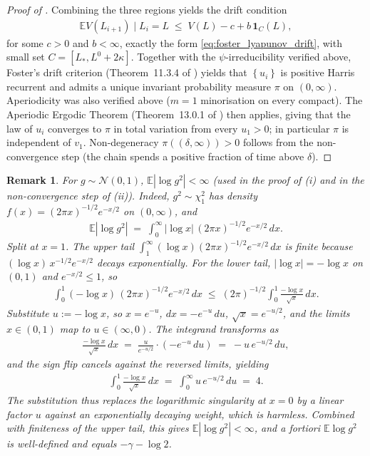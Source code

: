 \documentclass{article}
\newcommand{\Set}[1]{\left\{ #1 \right\}}
\newcommand{\Exp}[1]{\mathbb{E} #1}
\newcommand{\cond}{\mid}
\newtheorem{remark}[theorem]{Remark}
\newcommand{\mcN}{\mathcal{N}}
\begin{document}
\begin{proof}[Proof of ]
  Combining the three regions yields the drift condition
  \begin{eqnarray*}
    \Exp{V(L_{i+1}) \cond L_i = L} \;\le\; V(L) - c + b\,\mathbf{1}_C(L),
  \end{eqnarray*}
  for some $c > 0$ and $b < \infty$, exactly the form \eqref{eq:foster_lyapunov_drift}, with small set $C = [L_*, L^0 + 2\kappa]$. Together with the $\psi$-irreducibility verified above, Foster's drift criterion (Theorem~11.3.4 of \cite{meyn1993markov}) yields that $\Set{u_i}$ is positive Harris recurrent and admits a unique invariant probability measure $\pi$ on $(0, \infty)$. Aperiodicity was also verified above ($m = 1$ minorisation on every compact). The Aperiodic Ergodic Theorem (Theorem~13.0.1 of \cite{meyn1993markov}) then applies, giving that the law of $u_i$ converges to $\pi$ in total variation from every $u_1 > 0$; in particular $\pi$ is independent of $v_1$. Non-degeneracy $\pi((\delta,\infty)) > 0$ follows from the non-convergence step (the chain spends a positive fraction of time above $\delta$).
\end{proof}

\begin{remark}
  \label{rem:log_g_sq_integrable}
  For $g \sim \mcN(0, 1)$, $\Exp{|\log g^2|} < \infty$ (used in the proof of (i) and in the non-convergence step of (ii)). Indeed, $g^2 \sim \chi^2_1$ has density $f(x) = (2\pi x)^{-1/2} e^{-x/2}$ on $(0, \infty)$, and
  \begin{eqnarray*}
    \Exp{|\log g^2|} \;=\; \int_0^\infty |\log x|\,(2\pi x)^{-1/2} e^{-x/2}\,dx.
  \end{eqnarray*}
  Split at $x = 1$. The upper tail $\int_1^\infty (\log x)(2\pi x)^{-1/2} e^{-x/2}\,dx$ is finite because $(\log x)\,x^{-1/2} e^{-x/2}$ decays exponentially. For the lower tail, $|\log x| = -\log x$ on $(0,1)$ and $e^{-x/2} \le 1$, so
  \begin{eqnarray*}
    \int_0^1 (-\log x)\,(2\pi x)^{-1/2} e^{-x/2}\,dx \;\le\; (2\pi)^{-1/2}\!\int_0^1 \frac{-\log x}{\sqrt{x}}\,dx.
  \end{eqnarray*}
  Substitute $u := -\log x$, so $x = e^{-u}$, $dx = -e^{-u}\,du$, $\sqrt{x} = e^{-u/2}$, and the limits $x \in (0,1)$ map to $u \in (\infty, 0)$. The integrand transforms as
  \begin{eqnarray*}
    \frac{-\log x}{\sqrt{x}}\,dx \;=\; \frac{u}{e^{-u/2}}\cdot(-e^{-u}\,du) \;=\; -u\,e^{-u/2}\,du,
  \end{eqnarray*}
  and the sign flip cancels against the reversed limits, yielding
  \begin{eqnarray*}
    \int_0^1\frac{-\log x}{\sqrt{x}}\,dx \;=\; \int_0^\infty u\,e^{-u/2}\,du \;=\; 4.
  \end{eqnarray*}
  The substitution thus replaces the logarithmic singularity at $x = 0$ by a linear factor $u$ against an exponentially decaying weight, which is harmless. Combined with finiteness of the upper tail, this gives $\Exp{|\log g^2|} < \infty$, and a fortiori $\Exp{\log g^2}$ is well-defined and equals $-\gamma - \log 2$.
\end{remark}
\end{document}
